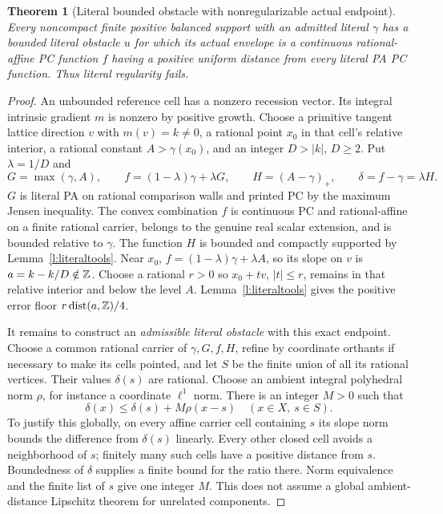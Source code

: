 \documentclass[11pt]{article}
\newtheorem{theorem}{Theorem}[section]
\begin{document}
\begin{theorem}[Literal bounded obstacle with nonregularizable actual endpoint]\label{t:literal}
Every noncompact finite positive balanced support with an admitted literal $\gamma$ has a bounded literal obstacle $u$ for which its actual envelope is a continuous rational-affine PC function $f$ having a positive uniform distance from every literal PA PC function. Thus literal regularity fails.
\end{theorem}
\begin{proof}
An unbounded reference cell has a nonzero recession vector. Its integral intrinsic gradient $m$ is nonzero by positive growth. Choose a primitive tangent lattice direction $v$ with $m(v)=k\ne0$, a rational point $x_0$ in that cell's relative interior, a rational constant $A>\gamma(x_0)$, and an integer $D>|k|$, $D\geq2$. Put $\lambda=1/D$ and
\[
 G=\max(\gamma,A),\qquad f=(1-\lambda)\gamma+\lambda G,\qquad
 H=(A-\gamma)_+,\qquad \delta=f-\gamma=\lambda H.                    \tag{7.1}
\]
$G$ is literal PA on rational comparison walls and printed PC by the maximum Jensen inequality. The convex combination $f$ is continuous PC and rational-affine on a finite rational carrier, belongs to the genuine real scalar extension, and is bounded relative to $\gamma$. The function $H$ is bounded and compactly supported by Lemma~\ref{l:literaltools}. Near $x_0$, $f=(1-\lambda)\gamma+\lambda A$, so its slope on $v$ is $a=k-k/D\notin\mathbb Z$. Choose a rational $r>0$ so $x_0+tv$, $|t|\leq r$, remains in that relative interior and below the level $A$. Lemma~\ref{l:literaltools} gives the positive error floor $r\operatorname{dist}(a,\mathbb Z)/4$.

It remains to construct an \emph{admissible literal obstacle} with this exact endpoint. Choose a common rational carrier of $\gamma,G,f,H$, refine by coordinate orthants if necessary to make its cells pointed, and let $S$ be the finite union of all its rational vertices. Their values $\delta(s)$ are rational. Choose an ambient integral polyhedral norm $\rho$, for instance a coordinate $\ell^1$ norm. There is an integer $M>0$ such that
\[
 \delta(x)\leq\delta(s)+M\rho(x-s)\quad(x\in X,\ s\in S).            \tag{7.2}
\]
To justify this globally, on every affine carrier cell containing $s$ its slope norm bounds the difference from $\delta(s)$ linearly. Every other closed cell avoids a neighborhood of $s$; finitely many such cells have a positive distance from $s$. Boundedness of $\delta$ supplies a finite bound for the ratio there. Norm equivalence and the finite list of $s$ give one integer $M$. This does not assume a global ambient-distance Lipschitz theorem for unrelated components.


\end{proof}
\end{document}
